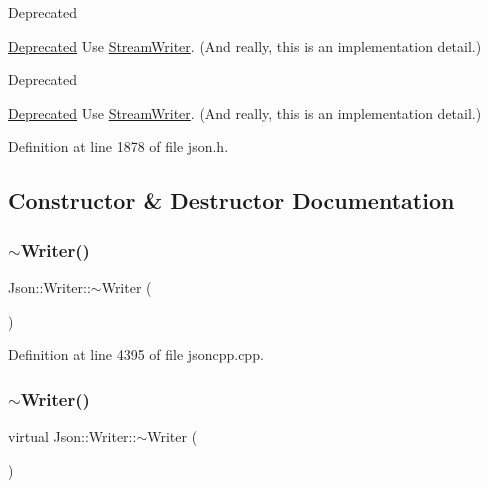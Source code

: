 \begin{DoxyRefDesc}{Deprecated}
\item[\hyperlink{deprecated__deprecated000007}{Deprecated}]Use \hyperlink{class_json_1_1_stream_writer}{Stream\+Writer}. (And really, this is an implementation detail.) \end{DoxyRefDesc}


\begin{DoxyRefDesc}{Deprecated}
\item[\hyperlink{deprecated__deprecated000017}{Deprecated}]Use \hyperlink{class_json_1_1_stream_writer}{Stream\+Writer}. (And really, this is an implementation detail.) \end{DoxyRefDesc}


Definition at line 1878 of file json.\+h.



\subsection{Constructor \& Destructor Documentation}
\hypertarget{class_json_1_1_writer_a3e618564336f26b14921f0d840db668c}{}\label{class_json_1_1_writer_a3e618564336f26b14921f0d840db668c} 
\subsubsection{\texorpdfstring{$\sim$\+Writer()}{~Writer()}\hspace{0.1cm}{\footnotesize\ttfamily [1/2]}}
{\footnotesize\ttfamily Json\+::\+Writer\+::$\sim$\+Writer (\begin{DoxyParamCaption}{ }\end{DoxyParamCaption})\hspace{0.3cm}{\ttfamily [virtual]}}



Definition at line 4395 of file jsoncpp.\+cpp.

\hypertarget{class_json_1_1_writer_a1414aeff9958fa970c6ac2e352786186}{}\label{class_json_1_1_writer_a1414aeff9958fa970c6ac2e352786186} 
\subsubsection{\texorpdfstring{$\sim$\+Writer()}{~Writer()}\hspace{0.1cm}{\footnotesize\ttfamily [2/2]}}
{\footnotesize\ttfamily virtual Json\+::\+Writer\+::$\sim$\+Writer (\begin{DoxyParamCaption}{ }\end{DoxyParamCaption})\hspace{0.3cm}{\ttfamily [virtual]}}



